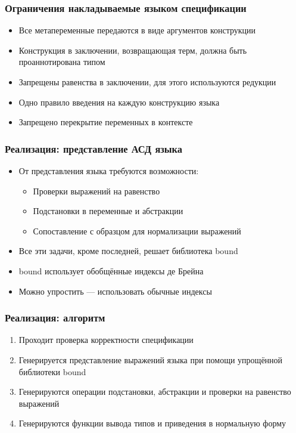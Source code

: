 \begin{frame}
\frametitle{Ограничения накладываемые языком спецификации}
\begin{itemize}
\item Все метапеременные передаются в виде аргументов конструкции
\item Конструкция в заключении, возвращающая терм, должна быть проаннотирована типом
\item Запрещены равенства в заключении, для этого используются редукции
\item Одно правило введения на каждую конструкцию языка
\item Запрещено перекрытие переменных в контексте
\end{itemize}
\end{frame}
\begin{frame}
\frametitle{Реализация: представление АСД языка}
\begin{itemize}
\item От представления языка требуются возможности:
  \begin{itemize}
    \item Проверки выражений на равенство
    \item Подстановки в переменные и абстракции
    \item Сопоставление с образцом для нормализации выражений
  \end{itemize}
\item Все эти задачи, кроме последней, решает библиотека bound
\item bound использует обобщённые индексы де Брейна
\item Можно упростить --- использовать обычные индексы
\end{itemize}
\end{frame}
\begin{frame}
\frametitle{Реализация: алгоритм}
\begin{enumerate}
\item Проходит проверка корректности спецификации
\item Генерируется представление выражений языка при помощи упрощённой библиотеки bound
\item Генерируются операции подстановки, абстракции и проверки на равенство выражений
\item Генерируются функции вывода типов и приведения в нормальную форму
\end{enumerate}
\end{frame}

